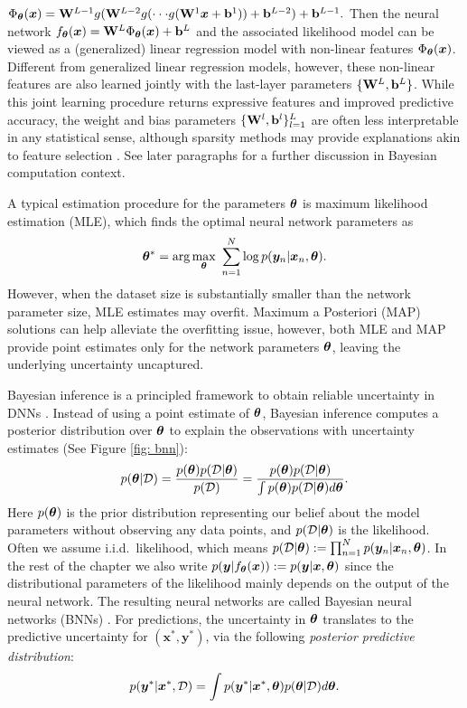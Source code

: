 $
\Phi_{\bm{\theta}}(\bm{x})=\mathbf{W}^{L-1} g(\mathbf{W}^{L-2}g(\cdot\cdot\cdot g(\mathbf{W}^1 \bm{x}+\mathbf{b}^1))+\mathbf{b}^{L-2})+\mathbf{b}^{L-1}.
$
Then the neural network $f_{\bm{\theta}}(\bm{x}) = \mathbf{W}^L \Phi_{\bm{\theta}}(\bm{x}) + \mathbf{b}^L$ and the associated likelihood model can be viewed as a (generalized) linear regression model with non-linear features $\Phi_{\bm{\theta}}(\bm{x})$. Different from generalized linear regression models, however, these non-linear features are also learned jointly with the last-layer parameters $\{ \mathbf{W}^L, \mathbf{b}^L \}$. While this joint learning procedure returns expressive features and improved predictive accuracy, the weight and bias parameters $\{ \mathbf{W}^l, \mathbf{b}^l \}_{l=1}^L$ are often less interpretable in any statistical sense, although sparsity methods may provide explanations akin to feature selection \citep{lemhadri2021lassonet,ghosh2019model}. See later paragraphs for a further discussion in Bayesian computation context.

A typical estimation procedure for the parameters $\bm{\theta}$ is maximum likelihood estimation (MLE), which finds the optimal neural network parameters as
\[\bm{\theta}^* = \arg\max_{\bm{\theta}} \ \sum_{n=1}^N \log p(\bm{y}_n | \bm{x}_n, \bm{\theta}). \]
However, when the dataset size is substantially smaller than the network parameter size, MLE estimates may overfit. Maximum a Posteriori (MAP) solutions can help alleviate the overfitting issue, however, both MLE and MAP provide point estimates only for the network parameters $\bm{\theta}$, leaving the underlying uncertainty uncaptured.

%
Bayesian inference is a principled framework to obtain reliable uncertainty in DNNs \citep{gal2016thesis}. Instead of using a point estimate of $\bm{\theta}$, Bayesian inference computes a posterior distribution over $\bm{\theta}$ to explain the observations with uncertainty estimates (See Figure \ref{fig: bnn}): 
%
\begin{equation}
    p(\bm{\theta}|\mathcal{D})=\frac{p(\bm{\theta})p(\mathcal{D}|\bm{\theta})}{p(\mathcal{D})}=\frac{p(\bm{\theta})p(\mathcal{D}|\bm{\theta})}{\int p(\bm{\theta})p(\mathcal{D}|\bm{\theta})d\bm{\theta}}.
\label{eq:bayespost}
\end{equation}
%
Here $p(\bm{\theta})$ is the prior distribution representing our belief about the model parameters without observing any data points, and $p(\mathcal{D}|\bm{\theta})$ is the likelihood. Often we assume i.i.d.~likelihood, which means
$p(\mathcal{D}|\bm{\theta}) := \prod_{n=1}^N p(\bm{y}_n | \bm{x}_n, \bm{\theta})$. 
%
In the rest of the chapter we also write $p(\bm{y} | f_{\bm{\theta}}(\bm{x})) := p(\bm{y} | \bm{x}, \bm{\theta})$ since the distributional parameters of the likelihood mainly depends on the output of the neural network.
%
The resulting neural networks are called Bayesian neural networks (BNNs) \citep{neal1996bayesian,mackay:practical1992,hinton:mdl1993}. For predictions, the uncertainty in $\bm{\theta}$ translates to the predictive uncertainty for $(\bm{x}^\ast, \bm{y}^\ast)$, via the following \emph{posterior predictive distribution}:
%
\begin{equation}
    p(\bm{y}^\ast|\bm{x}^\ast,\mathcal{D}) = \int p(\bm{y}^\ast|\bm{x}^\ast,\bm{\theta}) p(\bm{\theta}|\mathcal{D}) d\bm{\theta}.
\label{eq:bayespred}
\end{equation}

